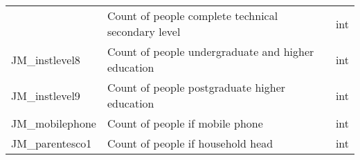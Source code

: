 \documentclass[11pt]{article}
\begin{document}
\begin{longtable}[]{@{}lll@{}}
\begin{minipage}[t]{0.63\columnwidth}
\end{minipage} & \begin{minipage}[t]{0.12\columnwidth}\raggedright\strut
Count of people complete technical secondary level\strut
\end{minipage} & \begin{minipage}[t]{0.16\columnwidth}\raggedright\strut
int\strut
\end{minipage}\tabularnewline
\begin{minipage}[t]{0.63\columnwidth}\raggedright\strut
JM\_instlevel8\strut
\end{minipage} & \begin{minipage}[t]{0.12\columnwidth}\raggedright\strut
Count of people undergraduate and higher education\strut
\end{minipage} & \begin{minipage}[t]{0.16\columnwidth}\raggedright\strut
int\strut
\end{minipage}\tabularnewline
\begin{minipage}[t]{0.63\columnwidth}\raggedright\strut
JM\_instlevel9\strut
\end{minipage} & \begin{minipage}[t]{0.12\columnwidth}\raggedright\strut
Count of people postgraduate higher education\strut
\end{minipage} & \begin{minipage}[t]{0.16\columnwidth}\raggedright\strut
int\strut
\end{minipage}\tabularnewline
\begin{minipage}[t]{0.63\columnwidth}\raggedright\strut
JM\_mobilephone\strut
\end{minipage} & \begin{minipage}[t]{0.12\columnwidth}\raggedright\strut
Count of people if mobile phone\strut
\end{minipage} & \begin{minipage}[t]{0.16\columnwidth}\raggedright\strut
int\strut
\end{minipage}\tabularnewline
\begin{minipage}[t]{0.63\columnwidth}\raggedright\strut
JM\_parentesco1\strut
\end{minipage} & \begin{minipage}[t]{0.12\columnwidth}\raggedright\strut
Count of people if household head\strut
\end{minipage} & \begin{minipage}[t]{0.16\columnwidth}\raggedright\strut
int\strut
\end{minipage}\tabularnewline

\end{longtable}
\end{document}
